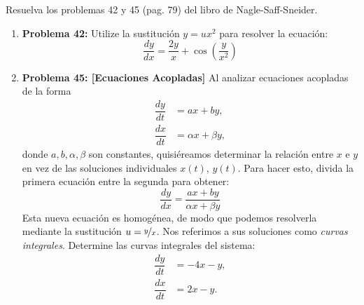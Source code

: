 \begin{ejercicio}
    Resuelva los problemas 42 y 45 (pag. 79) del libro de Nagle-Saff-Sneider.

    \begin{enumerate}
        \item \textbf{Problema 42:} Utilize la sustitución $y=ux^2$ para resolver la ecuación:
        \begin{equation*}
            \dfrac{dy}{dx} = \dfrac{2y}{x} + \cos\left(\dfrac{y}{x^2}\right)
        \end{equation*}

        
        \item \textbf{Problema 45: [Ecuaciones Acopladas]} Al analizar ecuaciones acopladas de la forma
        \begin{align*}
            \dfrac{dy}{dt} &= ax+by,\\
            \dfrac{dx}{dt} &= \alpha x+\beta y,
        \end{align*} 
        donde $a,b,\alpha,\beta$ son constantes, quisiéreamos determinar la relación entre $x$ e $y$ en vez de las soluciones individuales $x(t)$, $y(t)$. Para hacer esto, divida la primera ecuación entre la segunda para obtener:
        \begin{equation*}
            \dfrac{dy}{dx} = \dfrac{ax+by}{\alpha x+\beta y}
        \end{equation*}
        Esta nueva ecuación es homogénea, de modo que podemos resolverla mediante la sustitución $u=\nicefrac{y}{x}$. Nos referimos a sus soluciones como \emph{curvas integrales}. Determine las curvas integrales del sistema:
        \begin{align*}
            \dfrac{dy}{dt} &= -4x-y,\\
            \dfrac{dx}{dt} &= 2x-y.
        \end{align*}

    \end{enumerate}
\end{ejercicio}